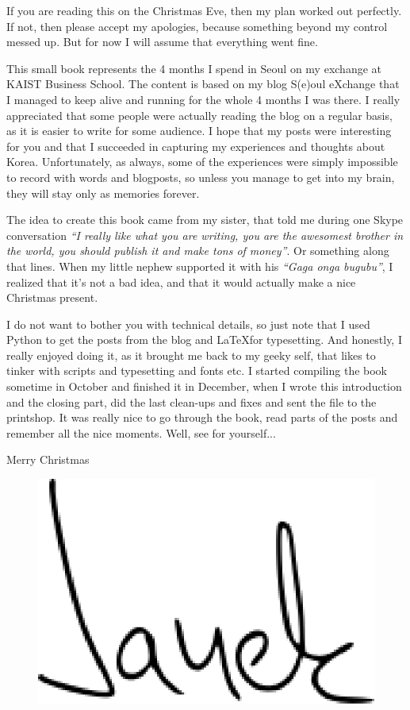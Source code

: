 If you are reading this on the Christmas Eve, then my plan worked out perfectly. If not, then please accept my apologies, because something beyond my control messed up. But for now I will assume that everything went fine.

This small book represents the 4 months I spend in Seoul on my exchange at KAIST Business School. The content is based on my blog S(e)oul eXchange that I managed to keep alive and running for the whole 4 months I was there. I really appreciated that some people were actually reading the blog on a regular basis, as it is easier to write for some audience. I hope that my posts were interesting for you and that I succeeded in capturing my experiences and thoughts about Korea. Unfortunately, as always, some of the experiences were simply impossible to record with words and blogposts, so unless you manage to get into my brain, they will stay only as memories forever.

The idea to create this book came from my sister, that told me during one Skype conversation \textit{``I really like what you are writing, you are the awesomest brother in the world, you should publish it and make tons of money''}. Or something along that lines. When my little nephew supported it with his \textit{``Gaga onga bugubu''}, I realized that it's not a bad idea, and that it would actually make a nice Christmas present.

I do not want to bother you with technical details, so just note that I used Python to get the posts from the blog and \LaTeX for typesetting. And honestly, I really enjoyed doing it, as it brought me back to my geeky self, that likes to tinker with scripts and typesetting and fonts etc. I started compiling the book sometime in October and finished it in December, when I wrote this introduction and the closing part, did the last clean-ups and fixes and sent the file to the printshop. It was really nice to go through the book, read parts of the posts and remember all the nice moments. Well, see for yourself...

Merry Christmas

\begin{figure}[h]
\raggedleft\includegraphics[height=2\baselineskip]{photos/signature}
\end{figure}
